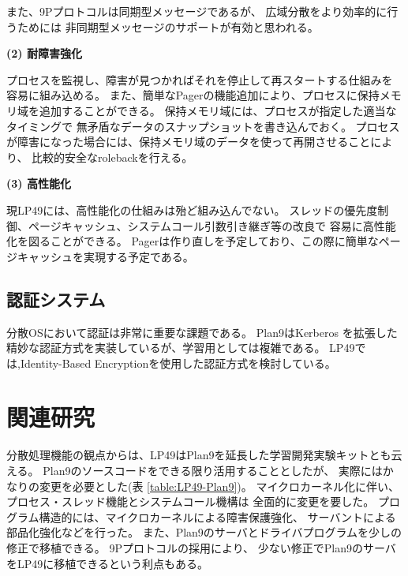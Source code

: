 \documentclass{ipsjpapers}
\begin{document}
また、9Pプロトコルは同期型メッセージであるが、
広域分散をより効率的に行うためには
非同期型メッセージのサポートが有効と思われる。



\begin{comment}
図 \ref{fig:simpleOS}

\begin{figure}[htb]
  \begin{center}
   \epsfxsize=400pt
   \epsfbox{../fig/simpleOS.eps}
    \caption{簡明なOS構成}
    \label{fig:simpleOS}
  \end{center}
\end{figure}
\end{comment}


{\bf\flushleft (2) 耐障害強化}

プロセスを監視し、障害が見つかればそれを停止して再スタートする仕組みを
容易に組み込める。
また、簡単なPagerの機能追加により、プロセスに保持メモリ域を追加することができる。
保持メモリ域には、プロセスが指定した適当なタイミングで
無矛盾なデータのスナップショットを書き込んでおく。
プロセスが障害になった場合には、保持メモリ域のデータを使って再開させることにより、
比較的安全なrolebackを行える。


{\bf\flushleft (3) 高性能化}
 
現LP49には、高性能化の仕組みは殆ど組み込んでない。
スレッドの優先度制御、ページキャッシュ、システムコール引数引き継ぎ等の改良で
容易に高性能化を図ることができる。
Pagerは作り直しを予定しており、この際に簡単なページキャッシュを実現する予定である。



\subsection{認証システム}

分散OSにおいて認証は非常に重要な課題である。
Plan9はKerberos を拡張した精妙な認証方式を実装しているが、学習用としては複雑である。
LP49では,Identity-Based Encryptionを使用した認証方式を検討している。



\section{関連研究}


分散処理機能の観点からは、LP49はPlan9を延長した学習開発実験キットとも云える。
Plan9のソースコードをできる限り活用することとしたが、
実際にはかなりの変更を必要とした(表 \ref{table:LP49-Plan9})。
マイクロカーネル化に伴い、プロセス・スレッド機能とシステムコール機構は
全面的に変更を要した。
プログラム構造的には、マイクロカーネルによる障害保護強化、
サーバントによる部品化強化などを行った。
また、Plan9のサーバとドライバプログラムを少しの修正で移植できる。
9Pプロトコルの採用により、
少ない修正でPlan9のサーバをLP49に移植できるという利点もある。
\end{document}
